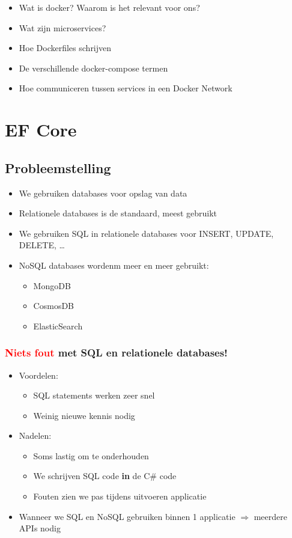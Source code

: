 \documentclass{article}
\begin{document}
\begin{itemize}
    \item Wat is docker? Waarom is het relevant voor ons?
    \item Wat zijn microservices?
    \item Hoe Dockerfiles schrijven
    \item De verschillende docker-compose termen
    \item Hoe communiceren tussen services in een Docker Network
\end{itemize}

\section{EF Core}

\subsection{Probleemstelling}

\begin{itemize}
    \item We gebruiken databases voor opslag van data
    \item Relationele databases is de standaard, meest gebruikt
    \item We gebruiken SQL in relationele databases voor INSERT, UPDATE, DELETE, \dots
    \item NoSQL databases wordenm meer en meer gebruikt:
    \begin{itemize}
        \item MongoDB
        \item CosmosDB
        \item ElasticSearch
    \end{itemize}
\end{itemize}

\subsubsection{\textcolor{red}{Niets fout} met SQL en relationele databases!}

\begin{itemize}
    \item Voordelen:
    \begin{itemize}
        \item SQL statements werken zeer snel
        \item Weinig nieuwe kennis nodig
    \end{itemize}
    \item Nadelen:
    \begin{itemize}
        \item Soms lastig om te onderhouden
        \item We schrijven SQL code \textbf{in} de C\# code
        \item Fouten zien we pas tijdens uitvoeren applicatie
    \end{itemize}
    \item Wanneer we SQL en NoSQL gebruiken binnen 1 applicatie $\Rightarrow$ meerdere APIs nodig
\end{itemize}
\end{document}
